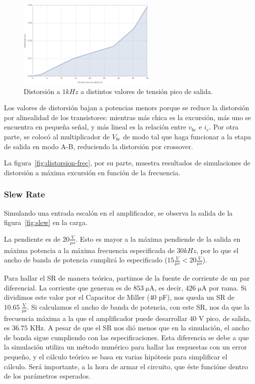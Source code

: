 \documentclass[a4paper,12pt,twoside]{article}
\begin{document}
\begin{figure}[H]
	\centering
	\includegraphics[width=0.6\textwidth]{img/sim/distorsion-barrido}
	\caption{Distorsión a $1kHz$ a distintos valores de tensión pico de salida.}
	\label{fig:distorsion-barrido}
\end{figure}

Los valores de distorsión bajan a potencias menors porque se reduce la distorsión por alinealidad de los transistores: mientras más chica es la excursión, más uno se encuentra en pequeña señal, y más lineal es la relación entre $v_{be}$ e $i_c$. Por otra parte, se colocó al multiplicador de $V_{be}$ de modo tal que haga funcionar a la etapa de salida en modo A-B, reduciendo la distorsión por crossover.

La figura~\ref{fig:distorsion-frec}, por su parte, muestra resultados de simulaciones de distorsión a máxima excursión en función de la frecuencia.

\subsubsection{Slew Rate} Simulando una entrada escalón en el amplificador, se observa la salida de la figura~\ref{fig:slew} en la carga.

La pendiente es de $20 \frac{V}{\mu s}$. Esto es mayor a la máxima pendiende de la salida en máxima potencia a la máxima frecuencia especificada de $30kHz$, por lo que el ancho de banda de potencia cumplirá lo especificado ($15 \frac{V}{\mu s}<20 \frac{V}{\mu s}$).

Para hallar el SR de manera teórica, partimos de la fuente de corriente de un par diferencial. La corriente que generan es de $853\; \mathrm{\mu A}$, es decir, $426\; \mathrm{\mu A}$ por rama. Si dividimos este valor por el Capacitor de Miller ($40$ pF), nos queda un SR de $10.65 \; \frac{\mathrm{V}}{\mathrm{\mu s}}$. Si calculamos el ancho de banda de potencia, con este SR, nos da que la frecuencia máxima a la que el amplificador puede desarrollar $40$ V pico, de salida, es $36.75$ KHz. A pesar de que el SR nos dió menos que en la simulación, el ancho de banda sigue cumpliendo con las especificaciones. Esta diferencia se debe a que la simulación utiliza un método numérico para hallar las respuestas con un error pequeño, y el cálculo teórico se basa en varias hipótesis para simplificar el cálculo. Será importante, a la hora de armar el circuito, que éste funcióne dentro de los parámetros esperados.
\end{document}
